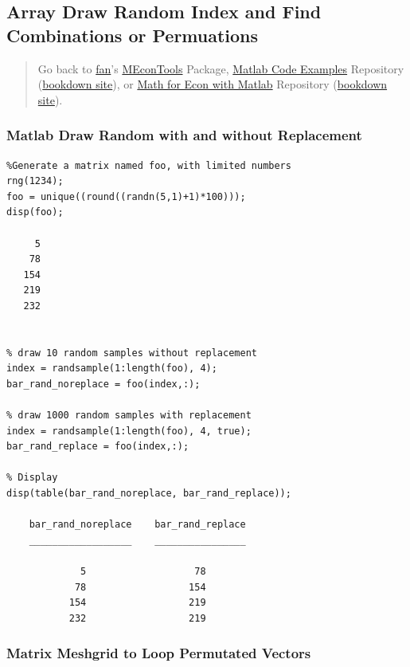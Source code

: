 \documentclass[
]{book}
\begin{document}
\hypertarget{array-draw-random-index-and-find-combinations-or-permuations}{%
\subsection{Array Draw Random Index and Find Combinations or Permuations}\label{array-draw-random-index-and-find-combinations-or-permuations}}

\begin{quote}
Go back to \href{http://fanwangecon.github.io/}{fan}'s \href{https://fanwangecon.github.io/MEconTools/}{MEconTools} Package, \href{https://fanwangecon.github.io/M4Econ/}{Matlab Code Examples} Repository (\href{https://fanwangecon.github.io/M4Econ/bookdown}{bookdown site}), or \href{https://fanwangecon.github.io/Math4Econ/}{Math for Econ with Matlab} Repository (\href{https://fanwangecon.github.io/Math4Econ/bookdown}{bookdown site}).
\end{quote}

\hypertarget{matlab-draw-random-with-and-without-replacement}{%
\subsubsection{\texorpdfstring{\textbf{Matlab Draw Random with and without Replacement}}{Matlab Draw Random with and without Replacement}}\label{matlab-draw-random-with-and-without-replacement}}

\begin{verbatim}
%Generate a matrix named foo, with limited numbers
rng(1234);
foo = unique((round((randn(5,1)+1)*100)));
disp(foo);

     5
    78
   154
   219
   232


% draw 10 random samples without replacement
index = randsample(1:length(foo), 4);
bar_rand_noreplace = foo(index,:);

% draw 1000 random samples with replacement
index = randsample(1:length(foo), 4, true);
bar_rand_replace = foo(index,:);

% Display
disp(table(bar_rand_noreplace, bar_rand_replace));

    bar_rand_noreplace    bar_rand_replace
    __________________    ________________

             5                   78       
            78                  154       
           154                  219       
           232                  219       
\end{verbatim}

\hypertarget{matrix-meshgrid-to-loop-permutated-vectors}{%
\subsubsection{Matrix Meshgrid to Loop Permutated Vectors}\label{matrix-meshgrid-to-loop-permutated-vectors}}
\end{document}
